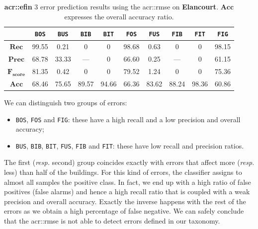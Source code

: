         \begin{table}[htpb]
            \footnotesize
            \begin{tabular}{c c c c c c c c c c}
                \toprule
                & \texttt{BOS} & \texttt{BUS} & \texttt{BIB} & \texttt{BIT} & \texttt{FOS} & \texttt{FUS} & \texttt{FIB} & \texttt{FIT} & \texttt{FIG} \\
                \midrule
                \(\bm{Rec}\) & 99.55 & 0.21 & 0 & 0 & 98.68 & 0.63 & 0 & 0 & 98.15 \\
                \midrule
                \(\bm{Prec}\) & 68.78 & 33.33 & --- & 0 & 66.60 & 0.25 & --- & 0 & 61.15 \\
                \midrule
                \(\bm{F_{score}}\) & 81.35 & 0.42 & 0 & 0 & 79.52 & 1.24 & 0 & 0 & 75.36 \\
                \midrule
                \(\bm{Acc}\) & 68.46 & 75.65 & 89.57 & 94.66 & 66.36 & 83.62 & 88.24 & 98.36 & 60.86 \\
                \bottomrule
            \end{tabular}
            \caption{
                \label{tab::rmse_results} \textbf{\gls{acr::efin}} 3 error prediction results using the \gls{acr::rmse} on \textbf{Elancourt}.
                \(\bm{Acc}\) expresses the overall accuracy ratio.
            }
        \end{table}

        We can distinguish two groups of errors: 
        \begin{itemize}[label=\(\blacktriangleright\)]
            \item \texttt{BOS}, \texttt{FOS} and \texttt{FIG}: these have a high recall and a low precision and overall accuracy;
            \item \texttt{BUS}, \texttt{BIB}, \texttt{BIT}, \texttt{FUS}, \texttt{FIB} and \texttt{FIT}: these have low recall and precision ratios.
        \end{itemize}
        The first (\textit{resp.} second) group coincides exactly with errors that affect more (\textit{resp.} less) than half of the buildings.
        For this kind of errors, the classifier assigns to almost all samples the positive class.
        In fact, we end up with a high ratio of false positives (false alarms) and hence a high recall ratio that is coupled with a weak precision and overall accuracy.
        Exactly the inverse happens with the rest of the errors as we obtain a high percentage of false negative.
        We can safely conclude that the \gls{acr::rmse} is not able to detect errors defined in our taxonomy.


